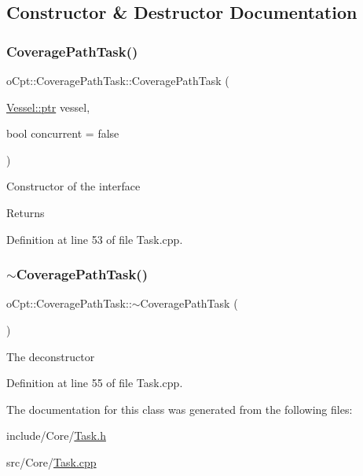 \subsection{Constructor \& Destructor Documentation}
\hypertarget{classo_cpt_1_1_coverage_path_task_ad08940ffc37098818fc119d6ea2d53f2}{}\label{classo_cpt_1_1_coverage_path_task_ad08940ffc37098818fc119d6ea2d53f2} 
\subsubsection{\texorpdfstring{Coverage\+Path\+Task()}{CoveragePathTask()}}
{\footnotesize\ttfamily o\+Cpt\+::\+Coverage\+Path\+Task\+::\+Coverage\+Path\+Task (\begin{DoxyParamCaption}\item[{\hyperlink{classo_cpt_1_1i_vessel_a43711a596f3bdfd0ca732ed3901edc97}{Vessel\+::ptr}}]{vessel,  }\item[{bool}]{concurrent = {\ttfamily false} }\end{DoxyParamCaption})}

Constructor of the interface \begin{DoxyReturn}{Returns}

\end{DoxyReturn}


Definition at line 53 of file Task.\+cpp.

\hypertarget{classo_cpt_1_1_coverage_path_task_a8773343bb232c3a22b8ec6acf483bee1}{}\label{classo_cpt_1_1_coverage_path_task_a8773343bb232c3a22b8ec6acf483bee1} 
\subsubsection{\texorpdfstring{$\sim$\+Coverage\+Path\+Task()}{~CoveragePathTask()}}
{\footnotesize\ttfamily o\+Cpt\+::\+Coverage\+Path\+Task\+::$\sim$\+Coverage\+Path\+Task (\begin{DoxyParamCaption}{ }\end{DoxyParamCaption})\hspace{0.3cm}{\ttfamily [virtual]}}

The deconstructor 

Definition at line 55 of file Task.\+cpp.



The documentation for this class was generated from the following files\+:\begin{DoxyCompactItemize}
\item 
include/\+Core/\hyperlink{_task_8h}{Task.\+h}\item 
src/\+Core/\hyperlink{_task_8cpp}{Task.\+cpp}\end{DoxyCompactItemize}
